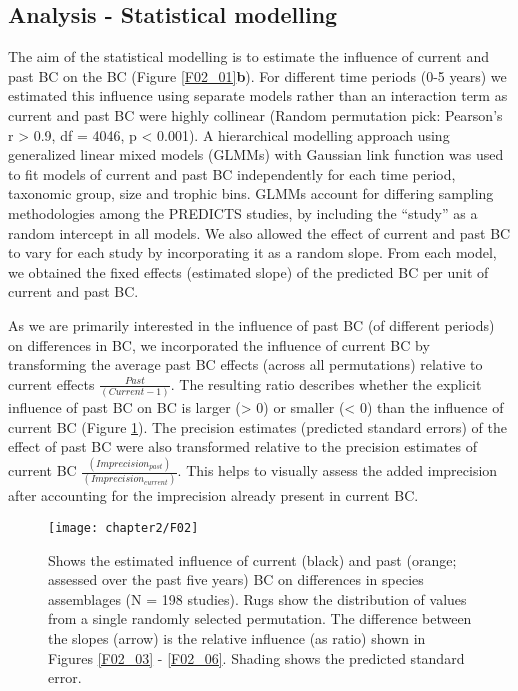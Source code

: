 \subsection{Analysis - Statistical modelling}
\label{C02_0205}
The aim of the statistical modelling is to estimate the influence of current and past BC on the BC (Figure \ref{F02_01}\textbf{b}). For different time periods (0-5 years) we estimated this influence using separate models rather than an interaction term as current and past BC were highly collinear (Random permutation pick: Pearson’s r > 0.9, df = 4046, p < 0.001). A hierarchical modelling approach using generalized linear mixed models (GLMMs) with Gaussian link function was used to fit models of current and past BC independently for each time period, taxonomic group, size and trophic bins. GLMMs account for differing sampling methodologies among the PREDICTS studies, by including the “study” as a random intercept in all models. We also allowed the effect of current and past BC to vary for each study by incorporating it as a random slope. From each model, we obtained the fixed effects (estimated slope) of the predicted BC per unit of current and past BC.

As we are primarily interested in the influence of past BC (of different periods) on differences in BC, we incorporated the influence of current BC by transforming the average past BC effects (across all permutations) relative to current effects $\frac{Past}{(Current - 1)}$. The resulting ratio describes whether the explicit influence of past BC on BC is larger (> 0) or smaller (< 0) than the influence of current BC (Figure \ref{F02_02}). The precision estimates (predicted standard errors) of the effect of past BC were also transformed relative to the precision estimates of current BC $\frac{(Imprecision_{past})}{(Imprecision_{current})}$. This helps to visually assess the added imprecision after accounting for the imprecision already present in current BC. 

\begin{figure}[ht]
\centering
\texttt{[image: chapter2/F02]}
\caption{Shows the estimated influence of current (black) and past (orange; assessed over the past five years) BC on differences in species assemblages (N = 198 studies). Rugs show the distribution of values from a single randomly selected permutation. The difference between the slopes (arrow) is the relative influence (as ratio) shown in Figures \ref{F02_03} - \ref{F02_06}. Shading shows the predicted standard error.}
\label{F02_02}
\end{figure}

